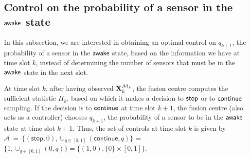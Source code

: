\documentclass[journal]{IEEEtran}
\newcommand{\wake}{{${\sf awake }$}}
\begin{document}
\subsection{Control on the probability of a sensor in the {\wake} state}
In this subsection, we are interested in obtaining an optimal control on 
$q_{k+1}$, the probability of a sensor in the {\wake} state, based on the
information we have at time slot $k$, instead of determining the number 
of sensors that must be in the {\wake} state in the next slot. 

At time slot $k$, after having observed ${\bf X}_k^{{\cal M}_k}$, the 
fusion centre computes the sufficient statistic $\Pi_k$, based on which
it makes a decision to ${\sf stop}$ or to ${\sf continue}$ sampling. If the 
decision is to ${\sf continue}$ at time slot $k+1$, the fusion centre 
(also acts as a controller) chooses $q_{k+1}$, the probability of a 
sensor to be in the {\wake} state at time slot $k+1$. Thus, the set of 
controls at time slot $k$ is given by 
$\mathcal{A}~=~\bigg\{
(\mathsf{stop},0), \cup_{q \in [0,1]} (\mathsf{continue},q) \bigg\}$ = $\bigg\{1, 
\cup_{q \in [0,1]} (0,q)\bigg\} = \{(1,0), \{0\}\times[0, 1]\}$.
\end{document}
